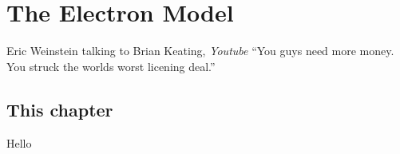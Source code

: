 \documentclass[../rzero]{subfiles}
\begin{document}
\chapter{The Electron Model}\label{electronModelChapter}

\begin{chapquote}{Eric Weinstein talking to Brian Keating, \textit{Youtube\cite{drbriankeatingEricWeinsteinTheoretical2020}}}
``You guys need more money. You struck the worlds worst licening deal.''
\end{chapquote}


\section{This chapter}
Hello
\end{document}
